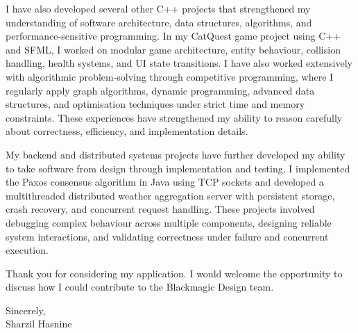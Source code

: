 \documentclass[letterpaper,11pt]{article}
\begin{document}
I have also developed several other C++ projects that strengthened my understanding of software architecture, data structures, algorithms, and performance-sensitive programming. In my CatQuest game project using C++ and SFML, I worked on modular game architecture, entity behaviour, collision handling, health systems, and UI state transitions. I have also worked extensively with algorithmic problem-solving through competitive programming, where I regularly apply graph algorithms, dynamic programming, advanced data structures, and optimisation techniques under strict time and memory constraints. These experiences have strengthened my ability to reason carefully about correctness, efficiency, and implementation details.

My backend and distributed systems projects have further developed my ability to take software from design through implementation and testing. I implemented the Paxos consensus algorithm in Java using TCP sockets and developed a multithreaded distributed weather aggregation server with persistent storage, crash recovery, and concurrent request handling. These projects involved debugging complex behaviour across multiple components, designing reliable system interactions, and validating correctness under failure and concurrent execution.

Thank you for considering my application. I would welcome the opportunity to discuss how I could contribute to the Blackmagic Design team.
\vspace{10pt}

Sincerely, \\
Sharzil Hasnine
\end{document}
